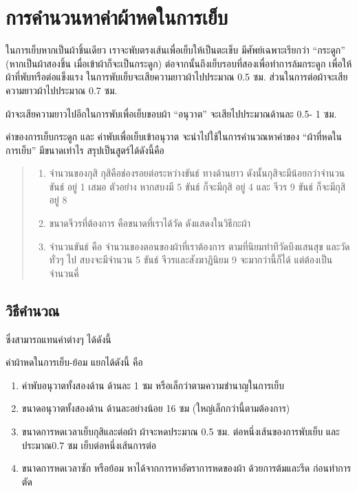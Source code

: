\section{การคำนวนหาค่าผ้าหดในการเย็บ}

ในการเย็บหากเป็นผ้าชิ้นเดียว เราจะพับตรงเส้นเพื่อเย็บให้เป็นตะเข็บ
มีศัพย์เฉพาะเรียกว่า ``กระดูก'' (หากเป็นผ้าสองชิ้น
เมื่อเข้าผ้าก็จะเป็นกระดูก)
ต่อจากนั้นถึงเย็บรอบที่สองเพื่อทำการล้มกระดูก
เพื่อให้ผ้าที่พับทรือต่อแข็งแรง ในการพับเย็บจะเสียความยาวผ้าไปประมาณ 0.5
ซม. ส่วนในการต่อผ้าจะเสียความยาวผ้าไปประมาณ 0.7 ซม.

ผ้าจะเสียความยาวไปอีกในการพับเพื่อเย็บขอบผ้า ``อนุวาต''
จะเสียไปประมาณด้านละ 0.5- 1 ซม.

ค่าของการเย็บกระดูก และ ค่าพับเพื่อเย็บเข้าอนุวาต
จะนำไปใช้ในการคำนวณหาค่าของ ``ผ้าที่หดในการเย็บ'' มีขนาดเท่าไร
สรุปเป็นสูตร์ได้ดังนี้คือ

\begin{quote}
\begin{enumerate}
\def\labelenumi{(\arabic{enumi})}
\item
  จำนวนของกุสิ กุสิคือช่องรอยต่อระหว่างขันธ์ ทางด้านยาว
  ดังนั้นกุสิจะมีน้อยกว่าจำนวนขันธ์ อยู่ 1 เสมอ ตัวอย่าง หากสบงมี 5
  ขันธ์ ก็จะมีกุสิ อยู่ 4 และ จีวร 9 ขันธ์ ก็จะมีกุสิอยู่ 8
\item
  ขนาดจีวรที่ต้องการ คือขนาดที่เราได้วัด ดังแสดงในวิธีกะผ้า
\item
  จำนวนขันธ์ คือ จำนวนของตอนของผ้าที่เราต้องการ
  ตามที่นิยมทำทีวัดบึงแสนสุข และวัดทั่วๆ ไป สบงจะมีจำนวน 5 ขันธ์
  จีวรและสังฆาฎินิยม 9 จะมากว่านี้ก็ได้ แต่ต้องเป็นจำนวนคี่
\end{enumerate}
\end{quote}

\subsection{วิธีคำนวณ}

ซึ่งสามารถแทนค่าต่างๆ ได้ดังนี้

ค่าผ้าหดในการเย็บ-ย้อม แยกได้ดังนี้ คือ

\begin{enumerate}
\def\labelenumi{(\arabic{enumi})}
\item
  ค่าพับอนุวาตทั้งสองด้าน ด้านละ 1 ซม หรือเล็กว่าตามความชำนาญในการเย็บ
\item
  ขนาดอนุวาตทั้งสองด้าน ด้านละอย่างน้อย 16 ซม
  (ใหญ่เล็กกว่านี้ตามต้องการ)
\item
  ขนาดการหดเวลาเย็บกุสิและต่อผ้า ผ้าจะหดประมาณ 0.5 ซม.
  ต่อหนึ่งเส้นของการพับเย็บ และประมาณ0.7 ซม เย็บต่อหนึ่งเส้นการต่อ
\item
  ขนาดการหดเวลาซัก หรือย้อม หาได้จากการหาอัตราการหดของผ้า
  ด้วยการต้มและรีด ก่อนทำการตัด
\end{enumerate}

